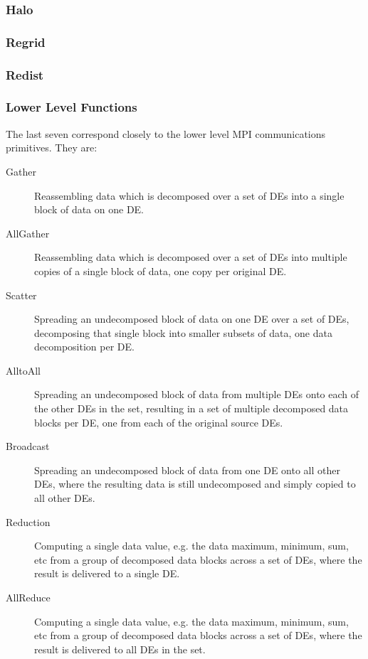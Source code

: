 \subsubsection{Halo}


\subsubsection{Regrid}



\subsubsection{Redist}


\subsubsection{Lower Level Functions}
The last seven correspond closely to the lower level
MPI communications primitives.  They are:
\begin{description}
\item[Gather]
Reassembling data which is decomposed over a set of DEs into a single
block of data on one DE.
\item[AllGather]
Reassembling data which is decomposed over a set of DEs into multiple
copies of a single block of data, one copy per original DE.
\item[Scatter]
Spreading an undecomposed block of data on one DE over a set of DEs,
decomposing that single block into smaller subsets of data, one
data decomposition per DE.
\item[AlltoAll]
Spreading an undecomposed block of data from multiple DEs onto
each of the other DEs in the set, resulting in a set of multiple decomposed 
data blocks per DE, one from each of the original source DEs.
\item[Broadcast]
Spreading an undecomposed block of data from one DE onto all other
DEs, where the resulting data is still undecomposed and simply
copied to all other DEs.
\item[Reduction]
Computing a single data value, e.g. the data maximum, minimum, sum, etc
from a group of decomposed data blocks across a set of DEs, where the
result is delivered to a single DE.
\item[AllReduce]
Computing a single data value, e.g. the data maximum, minimum, sum, etc
from a group of decomposed data blocks across a set of DEs, where the
result is delivered to all DEs in the set.
\end{description}

